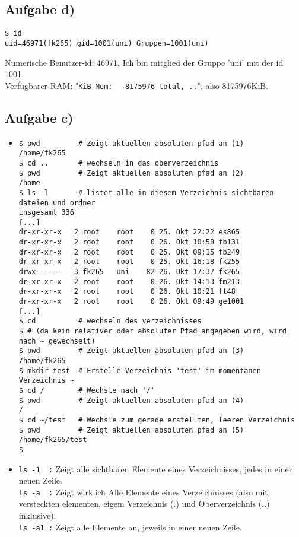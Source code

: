 \documentclass{scrartcl}
\begin{document}
\subsection*{Aufgabe d)}
\begin{verbatim}
$ id
uid=46971(fk265) gid=1001(uni) Gruppen=1001(uni)
\end{verbatim}
Numerische Benutzer-id: 46971, Ich bin mitglied der Gruppe 'uni' mit der id 1001. \\
Verfügbarer RAM: "\verb!KiB Mem:   8175976 total, ..!", also 8175976KiB.

\newpage

\subsection*{Aufgabe c)}
\begin{itemize}

\item\begin{verbatim}
$ pwd         # Zeigt aktuellen absoluten pfad an (1)
/home/fk265
$ cd ..       # wechseln in das oberverzeichnis
$ pwd         # Zeigt aktuellen absoluten pfad an (2)
/home
$ ls -l       # listet alle in diesem Verzeichnis sichtbaren dateien und ordner
insgesamt 336
[...]
dr-xr-xr-x   2 root    root    0 25. Okt 22:22 es865
dr-xr-xr-x   2 root    root    0 26. Okt 10:58 fb131
dr-xr-xr-x   2 root    root    0 25. Okt 09:15 fb249
dr-xr-xr-x   2 root    root    0 25. Okt 16:18 fk255
drwx------   3 fk265   uni    82 26. Okt 17:37 fk265
dr-xr-xr-x   2 root    root    0 26. Okt 14:13 fm213
dr-xr-xr-x   2 root    root    0 26. Okt 10:21 ft48
dr-xr-xr-x   2 root    root    0 26. Okt 09:49 ge1001
[...]
$ cd          # wechseln des verzeichnisses
$ # (da kein relativer oder absoluter Pfad angegeben wird, wird nach ~ gewechselt)
$ pwd         # Zeigt aktuellen absoluten pfad an (3)
/home/fk265
$ mkdir test  # Erstelle Verzeichnis 'test' im momentanen Verzeichnis ~
$ cd /        # Wechsle nach '/'
$ pwd         # Zeigt aktuellen absoluten pfad an (4)
/
$ cd ~/test   # Wechsle zum gerade erstellten, leeren Verzeichnis
$ pwd         # Zeigt aktuellen absoluten pfad an (5)
/home/fk265/test
$
\end{verbatim}

\item\verb!ls -1  :! Zeigt alle sichtbaren Elemente eines Verzeichnisses, jedes in einer neuen Zeile. \\
\verb!ls -a  :! Zeigt wirklich Alle Elemente eines Verzeichnisses (also mit versteckten elementen, eigem Verzeichnis (.) und Oberverzeichnis (..) inklusive). \\
\verb!ls -a1 :! Zeigt alle Elemente an, jeweils in einer neuen Zeile.


\end{itemize}
\end{document}
